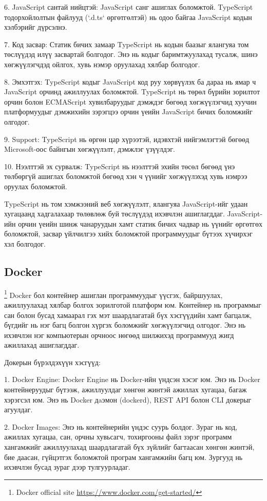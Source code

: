 			6. JavaScript сантай нийцтэй: JavaScript санг ашиглах боломжтой. TypeScript тодорхойлолтын файлууд (`.d.ts` өргөтгөлтэй) нь одоо байгаа JavaScript кодын хэлбэрийг дүрсэлнэ.
			
			7. Код засвар: Статик бичих замаар TypeScript нь кодын баазыг ялангуяа том төслүүдэд илүү засвартай болгодог. Энэ нь кодыг баримтжуулахад тусалж, шинэ хөгжүүлэгчдэд ойлгох, хувь нэмэр оруулахад хялбар болгодог.
			
			8. Эмхэтгэх: TypeScript кодыг JavaScript код руу хөрвүүлэх ба дараа нь ямар ч JavaScript орчинд ажиллуулах боломжтой. TypeScript нь төрөл бүрийн зорилтот орчин болон ECMAScript хувилбаруудыг дэмждэг бөгөөд хөгжүүлэгчид хуучин платформуудыг дэмжихийн зэрэгцээ орчин үеийн JavaScript бичих боломжийг олгодог.
			
			9. Support: TypeScript нь өргөн цар хүрээтэй, идэвхтэй нийгэмлэгтэй бөгөөд Microsoft-оос байнгын хөгжүүлэлт, дэмжлэг үзүүлдэг.
			
			10. Нээлттэй эх сурвалж: TypeScript нь нээлттэй эхийн төсөл бөгөөд үнэ төлбөргүй ашиглах боломжтой бөгөөд хэн ч үүнийг хөгжүүлэхэд хувь нэмрээ оруулах боломжтой.
			
			TypeScript нь том хэмжээний веб хөгжүүлэлт, ялангуяа JavaScript-ийг удаан хугацаанд хадгалахаар төлөвлөж буй төслүүдэд ихэвчлэн ашиглагддаг. JavaScript-ийн орчин үеийн шинж чанаруудын хамт статик бичих чадвар нь үүнийг өргөтгөх боломжтой, засвар үйлчилгээ хийх боломжтой программуудыг бүтээх хүчирхэг хэл болгодог. 
	\pagebreak
\subsection{Docker}
		\footnote{Docker official site \url{https://www.docker.com/get-started/}}
			\quad \quad Docker бол контейнер ашиглан программуудыг үүсгэх, байршуулах, ажиллуулахад хялбар болгох зорилготой платформ юм. Контейнер нь программыг сан болон бусад хамаарал гэх мэт шаардлагатай бүх хэсгүүдийн хамт багцалж, бүгдийг нь нэг багц болгон хүргэх боломжийг хөгжүүлэгчид олгодог. Энэ нь ихэвчлэн нэг компьютерын орчноос нөгөөд шилжихэд программууд жигд ажиллахад ашиглагддаг.

			Докерын бүрэлдэхүүн хэсгүүд:
			
			1. Docker Engine: Docker Engine нь Docker-ийн үндсэн хэсэг юм. Энэ нь Docker контейнеруудыг бүтээж, ажиллуулдаг хөнгөн жинтэй ажиллах хугацаа, багаж хэрэгсэл юм. Энэ нь Docker дaэмон (dockerd), REST API болон CLI докерыг агуулдаг.
			
			2. Docker Images: Энэ нь контейнерийн үндэс суурь болдог. Зураг нь код, ажиллах хугацаа, сан, орчны хувьсагч, тохиргооны файл зэрэг программ хангамжийг ажиллуулахад шаардлагатай бүх зүйлийг багтаасан хөнгөн жинтэй, бие даасан, гүйцэтгэх боломжтой програм хангамжийн багц юм. Зургууд нь ихэвчлэн бусад зураг дээр тулгуурладаг.
			
